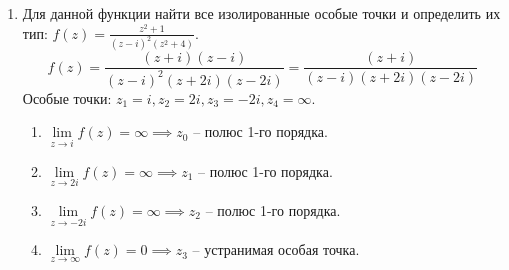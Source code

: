 \documentclass[14pt, a4paper, titlepage, fleqn]{extarticle}
\begin{document}
\begin{enumerate}
        \item Для данной функции найти все изолированные особые точки и определить их тип: \( \displaystyle f(z) = \frac{z^2+1}{(z-i)^2(z^2+4)} \).
        \[
            f(z) = \frac{(z+i)(z-i)}{(z-i)^2(z+2i)(z-2i)} = \frac{(z+i)}{(z-i)(z+2i)(z-2i)}
        \]
        Особые точки: \( z_1 = i, z_2 = 2i, z_3 = -2i, z_4 = \infty \).
        \begin{enumerate}
            \item \( \lim\limits_{z\to i} f(z) = \infty \implies z_0 \) -- полюс 1-го порядка. 
            \item \( \lim\limits_{z\to 2i} f(z) = \infty \implies z_1 \) -- полюс 1-го порядка. 
            \item \( \lim\limits_{z\to -2i} f(z) = \infty \implies z_2 \) -- полюс 1-го порядка.
            \item \( \lim\limits_{z\to \infty} f(z) = 0 \implies z_3 \) -- устранимая особая точка. 
        \end{enumerate}
    \end{enumerate}
\end{document}
